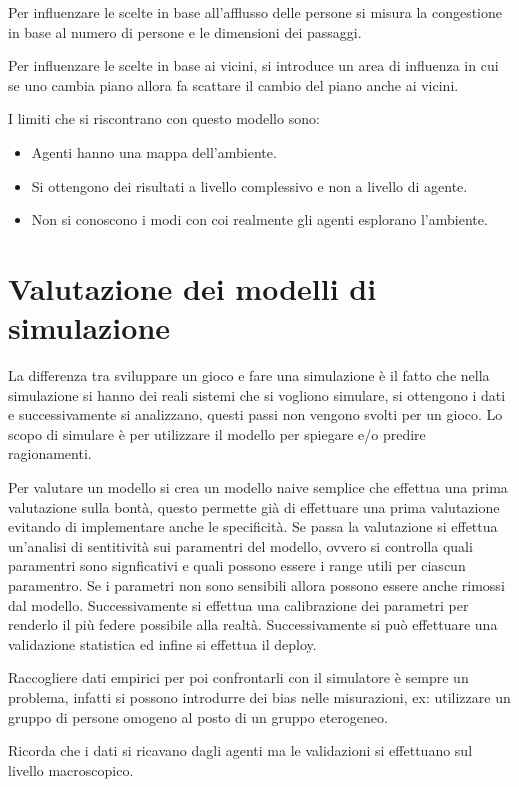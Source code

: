 Per influenzare le scelte in base all'afflusso delle persone si misura la congestione
in base al numero di persone e le dimensioni dei passaggi.

Per influenzare le scelte in base ai vicini, si introduce un area di influenza
in cui se uno cambia piano allora fa scattare il cambio del piano anche ai vicini.

I limiti che si riscontrano con questo modello sono:
\begin{itemize}
    \item Agenti hanno una mappa dell'ambiente.
    \item Si ottengono dei risultati a livello complessivo e non a livello di agente.
    \item Non si conoscono i modi con coi realmente gli agenti esplorano l'ambiente.
\end{itemize}

\section{Valutazione dei modelli di simulazione}
La differenza tra sviluppare un gioco e fare una simulazione è il fatto che
nella simulazione si hanno dei reali sistemi che si vogliono simulare, si ottengono
i dati e successivamente si analizzano, questi passi non vengono svolti per un gioco.
Lo scopo di simulare è per utilizzare il modello per spiegare e/o predire ragionamenti.

Per valutare un modello si crea un modello naive semplice che effettua una prima
valutazione sulla bontà, questo permette già di effettuare una prima valutazione
evitando di implementare anche le specificità. Se passa la valutazione si
effettua un'analisi di sentitività sui paramentri del modello, ovvero si controlla quali paramentri
sono signficativi e quali possono essere i range utili per ciascun paramentro.
Se i parametri non sono sensibili allora possono essere anche rimossi dal modello.
Successivamente si effettua una calibrazione dei parametri per renderlo il più federe
possibile alla realtà. Successivamente si può effettuare una validazione statistica
ed infine si effettua il deploy.

Raccogliere dati empirici per poi confrontarli con il simulatore è sempre un problema,
infatti si possono introdurre dei bias nelle misurazioni, ex: utilizzare un gruppo
di persone omogeno al posto di un gruppo eterogeneo.

Ricorda che i dati si ricavano dagli agenti ma le validazioni si effettuano sul
livello macroscopico.
